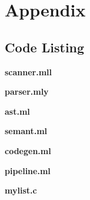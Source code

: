 \documentclass[./Report_main.tex]{subfiles}
\begin{document}


\chapter{Appendix}
\section*{Code Listing}
\textbf{scanner.mll}

\textbf{parser.mly}

\textbf{ast.ml}

\textbf{semant.ml}

\textbf{codegen.ml}

\textbf{pipeline.ml}

\textbf{mylist.c}

\end{document}
